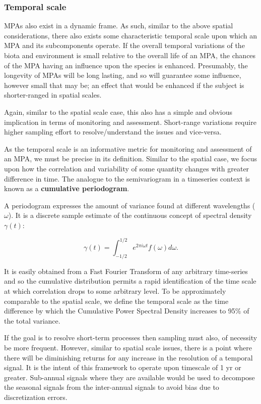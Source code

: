 \documentclass[letterpaper,portrait,11pt]{scrartcl}
\numberwithin{equation}{section}    %
\numberwithin{figure}{section}    %
\numberwithin{table}{section}       %
\begin{document}
\subsubsection{Temporal scale}
\label{sec:interpolationTS}

MPAs also exist in a dynamic frame. As such, similar to the above spatial considerations, there also exists some characteristic temporal scale upon which an MPA and its subcomponents operate. If the overall temporal variations of the biota and environment is small relative to the overall life of an MPA, the chances of the MPA having an influence upon the species is enhanced. Presumably, the longevity of MPAs will be long lasting, and so will guarantee some influence, however small that may be; an effect that would be enhanced if the subject is shorter-ranged in spatial scales.

Again, similar to the spatial scale case, this also has a simple and obvious implication in terms of monitoring and assessment. Short-range variations require higher sampling effort to resolve/understand the issues and vice-versa.

As the temporal scale is an informative metric for monitoring and assessment of an MPA, we must be precise in its definition. Similar to the spatial case, we focus upon how the correlation and variability of some quantity changes with greater difference in time. The analogue to the semivariogram in a timeseries context is known as a \textbf{cumulative periodogram}. 

A periodogram expresses the amount of variance found at different wavelengths ($\omega$). It is a discrete sample estimate of the continuous concept of spectral density $\gamma(t)$: 

\begin{equation}
  \label{eq:spectraldDensity}
  \gamma(t) = \int_{-1/2}^{1/2} e^{2\pi i \omega t} f(\omega) d \omega.
\end{equation}


It is easily obtained from a Fast Fourier Transform of any arbitrary time-series and so the cumulative distribution permits a rapid identification of the time scale at which correlation drops to some arbitrary level. To be approximately comparable to the spatial scale, we define the temporal scale as the time difference by which the Cumulative Power Spectral Density increases to 95\% of the total variance.

If the goal is to resolve short-term processes then sampling must also, of necessity be more frequent. However, similar to spatial scale issues, there is a point where there will be diminishing returns for any increase in the resolution of a temporal signal. It is the intent of this framework to operate upon timescale of 1 yr or greater. Sub-annual signals where they are available would be used to decompose the seasonal signals from the inter-annual signals to avoid bias due to discretization errors. 
\end{document}
